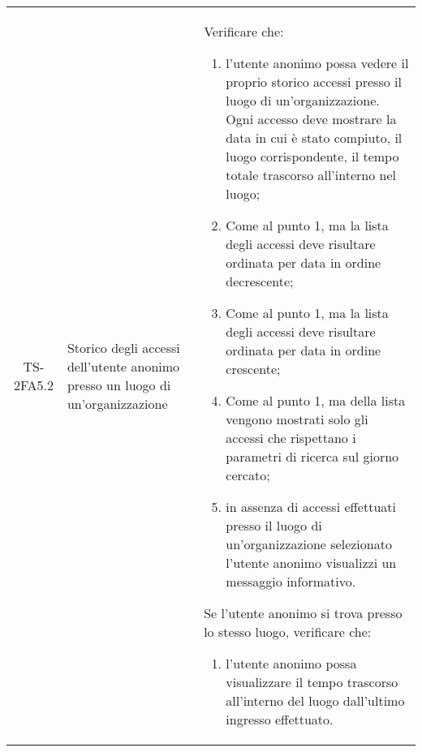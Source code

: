 {\begin{longtable}{ c | C{3cm} | C{11cm} }
TS-2FA5.2 & Storico degli accessi dell'utente anonimo presso un luogo di un'organizzazione & 
Verificare che:    
\begin{enumerate}
    \item l'utente anonimo possa vedere il proprio storico accessi presso il luogo di un'organizzazione. Ogni accesso deve mostrare la data in cui è stato compiuto, il luogo corrispondente, il tempo totale trascorso all'interno nel luogo;
    \item Come al punto 1, ma la lista degli accessi deve risultare ordinata per data in ordine decrescente;
    \item Come al punto 1, ma la lista degli accessi deve risultare ordinata per data in ordine crescente;
    \item Come al punto 1, ma della lista vengono mostrati solo gli accessi che rispettano i parametri di ricerca sul giorno cercato;
    \item in assenza di accessi effettuati presso il luogo di un'organizzazione selezionato l'utente anonimo visualizzi un messaggio informativo.
\end{enumerate}
Se l'utente anonimo si trova presso lo stesso luogo, verificare che:
\begin{enumerate}
    \item l'utente anonimo possa visualizzare il tempo trascorso all'interno del luogo dall'ultimo ingresso effettuato.
\end{enumerate} \\


\end{longtable}}
